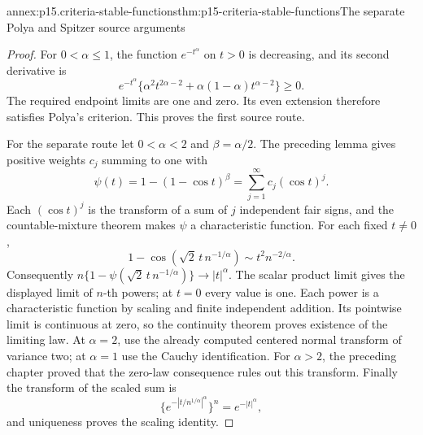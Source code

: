 \begin{annexitem}{annex:p15.criteria-stable-functions}{thm:p15-criteria-stable-functions}{The separate Polya and Spitzer source arguments}
\begin{proof}
For \(0<\alpha\leq1\), the function \(e^{-t^\alpha}\)
on \(t>0\) is decreasing, and its second derivative is
\[
 e^{-t^\alpha}
 \{\alpha^2t^{2\alpha-2}+\alpha(1-\alpha)t^{\alpha-2}\}
 \geq0.
\]
The required endpoint limits are one and zero.
Its even extension therefore satisfies Polya's criterion.
This proves the first source route.

For the separate route let \(0<\alpha<2\) and
\(\beta=\alpha/2\).
The preceding lemma gives positive weights \(c_j\)
summing to one with
\[
 \psi(t)=1-(1-\cos t)^\beta
                         =\sum_{j=1}^\infty c_j(\cos t)^j.
\]
Each \((\cos t)^j\) is the transform of a sum of \(j\)
independent fair signs, and the countable-mixture
theorem makes \(\psi\) a characteristic function.
For each fixed \(t\ne0\),
\[
 1-\cos(\sqrt2\,t\,n^{-1/\alpha})
                       \sim t^2 n^{-2/\alpha}.
\]
Consequently
\(n\{1-\psi(\sqrt2\,t\,n^{-1/\alpha})\}\to|t|^\alpha\).
The scalar product limit gives the displayed limit
of \(n\)-th powers; at \(t=0\) every value is one.
Each power is a characteristic function by scaling
and finite independent addition. Its pointwise limit
is continuous at zero, so the continuity theorem
proves existence of the limiting law.
At \(\alpha=2\), use the already computed centered
normal transform of variance two; at \(\alpha=1\)
use the Cauchy identification.
For \(\alpha>2\), the preceding chapter proved that
the zero-law consequence rules out this transform.
Finally the transform of the scaled sum is
\[
 \{e^{-|t/n^{1/\alpha}|^\alpha}\}^n=e^{-|t|^\alpha},
\]
and uniqueness proves the scaling identity.
\end{proof}
\end{annexitem}

